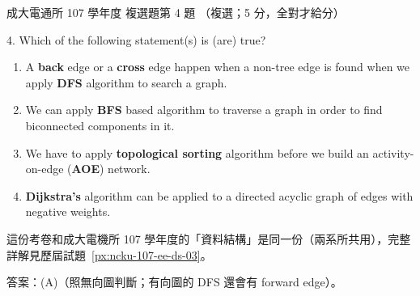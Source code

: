 \begin{pastexam}[label={px:ncku-107-cce-03}]{成大電通所 107 學年度 複選題第 4 題}
（複選；5 分，全對才給分）

4. Which of the following statement(s) is (are) true?
\begin{enumerate}[label=(\Alph*)]
\item A \textbf{back} edge or a \textbf{cross} edge happen when a non-tree edge is found when we apply
\textbf{DFS} algorithm to search a graph.
\item We can apply \textbf{BFS} based algorithm to traverse a graph in order to find biconnected
components in it.
\item We have to apply \textbf{topological sorting} algorithm before we build an activity-on-edge
(\textbf{AOE}) network.
\item \textbf{Dijkstra's} algorithm can be applied to a directed acyclic graph of edges with negative
weights.
\end{enumerate}
\end{pastexam}

\begin{pastsoln}
這份考卷和成大電機所 107 學年度的「資料結構」是同一份（兩系所共用），完整詳解見歷屆試題~\ref{px:ncku-107-ee-ds-03}。

答案：(A)（照無向圖判斷；有向圖的 DFS 還會有 forward edge）。
\end{pastsoln}
